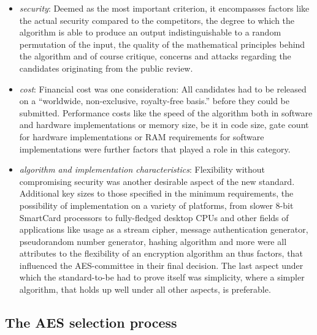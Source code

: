 \begin{itemize}
\item
  \emph{security}: Deemed as the most important criterion, it
  encompasses factors like the actual security compared to the
  competitors, the degree to which the algorithm is able to produce an
  output indistinguishable to a random permutation of the input, the
  quality of the mathematical principles behind the algorithm and of
  course critique, concerns and attacks regarding the candidates
  originating from the public review.
\item
  \emph{cost}: Financial cost was one consideration: All candidates had
  to be released on a ``worldwide, non-exclusive, royalty-free basis.''
  before they could be submitted. Performance costs like the speed of
  the algorithm both in software and hardware implementations or memory
  size, be it in code size, gate count for hardware implementations or
  RAM requirements for software implementations were further factors
  that played a role in this category.
\item
  \emph{algorithm and implementation characteristics}: Flexibility
  without compromising security was another desirable aspect of the new
  standard. Additional key sizes to those specified in the minimum
  requirements, the possibility of implementation on a variety of
  platforms, from slower 8-bit SmartCard processors to fully-fledged
  desktop CPUs and other fields of applications like usage as a stream
  cipher, message authentication generator, pseudorandom number
  generator, hashing algorithm and more were all attributes to the
  flexibility of an encryption algorithm an thus factors, that
  influenced the AES-committee in their final decision. The last aspect
  under which the standard-to-be had to prove itself was simplicity,
  where a simpler algorithm, that holds up well under all other aspects,
  is preferable.
\end{itemize}


\subsection{The AES selection process}
\label{ch:aes}


